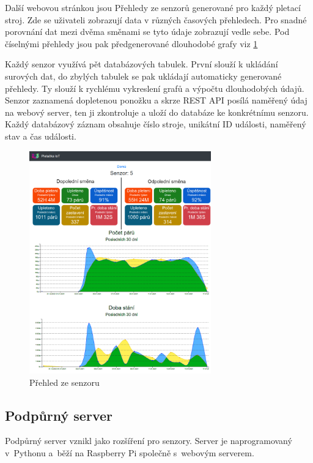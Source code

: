 \documentclass[12pt, a4paper]{article}
\begin{document}
Další webovou stránkou jsou Přehledy ze senzorů generované pro každý pletací stroj.
Zde se uživateli zobrazují data v různých časových přehledech.
Pro snadné porovnání dat mezi dvěma směnami se tyto údaje zobrazují vedle sebe.
Pod číselnými přehledy jsou pak předgenerované dlouhodobé grafy viz \ref{fig:webSenzory}

Každý senzor využívá pět databázových tabulek. První slouží k ukládání surových dat, do zbylých tabulek se pak ukládají automaticky generované přehledy.
Ty slouží k rychlému vykreslení grafů a výpočtu dlouhodobých údajů.
Senzor zaznamená dopletenou ponožku a skrze REST API posílá naměřený údaj na webový server, ten ji zkontroluje a uloží do databáze ke konkrétnímu senzoru.
Každý databázový záznam obsahuje číslo stroje, unikátní ID události, naměřený stav a čas události.

\begin{figure}[t]
    \centering
    \includegraphics[width=0.7\textwidth]{img/prehled.png}
    \caption{Přehled ze senzoru}
    \label{fig:webSenzory}
\end{figure}


\subsection*{Podpůrný server}
Podpůrný server vznikl jako rozšíření pro senzory.
Server je naprogramovaný v~Pythonu a~běží na Raspberry Pi společně s~webovým serverem.\newline
\end{document}
